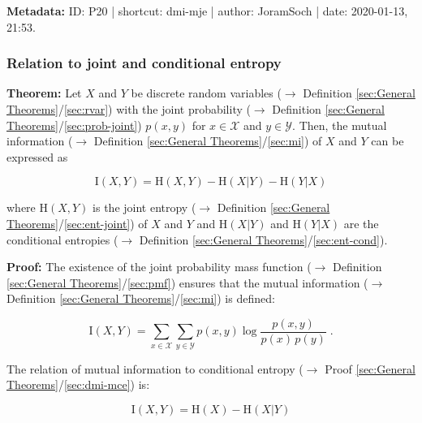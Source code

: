 \documentclass[a4paper,12pt,twoside]{book}
\begin{document}
\vspace{1em}
\textbf{Metadata:} ID: P20 | shortcut: dmi-mje | author: JoramSoch | date: 2020-01-13, 21:53.
\vspace{1em}



\subsubsection[\textbf{Relation to joint and conditional entropy}]{Relation to joint and conditional entropy} \label{sec:dmi-jce}
\setcounter{equation}{0}

\textbf{Theorem:} Let $X$ and $Y$ be discrete random variables ($\rightarrow$ Definition \ref{sec:General Theorems}/\ref{sec:rvar}) with the joint probability ($\rightarrow$ Definition \ref{sec:General Theorems}/\ref{sec:prob-joint}) $p(x,y)$ for $x \in \mathcal{X}$ and $y \in \mathcal{Y}$. Then, the mutual information ($\rightarrow$ Definition \ref{sec:General Theorems}/\ref{sec:mi}) of $X$ and $Y$ can be expressed as

\begin{equation} \label{eq:dmi-jce-dmi-jce}
\mathrm{I}(X,Y) = \mathrm{H}(X,Y) - \mathrm{H}(X|Y) - \mathrm{H}(Y|X)
\end{equation}

where $\mathrm{H}(X,Y)$ is the joint entropy ($\rightarrow$ Definition \ref{sec:General Theorems}/\ref{sec:ent-joint}) of $X$ and $Y$ and $\mathrm{H}(X \vert Y)$ and $\mathrm{H}(Y \vert X)$ are the conditional entropies ($\rightarrow$ Definition \ref{sec:General Theorems}/\ref{sec:ent-cond}).


\vspace{1em}
\textbf{Proof:} The existence of the joint probability mass function ($\rightarrow$ Definition \ref{sec:General Theorems}/\ref{sec:pmf}) ensures that the mutual information ($\rightarrow$ Definition \ref{sec:General Theorems}/\ref{sec:mi}) is defined:

\begin{equation} \label{eq:dmi-jce-MI}
\mathrm{I}(X,Y) = \sum_{x \in \mathcal{X}} \sum_{y \in \mathcal{Y}} p(x,y) \log \frac{p(x,y)}{p(x)\,p(y)} \; .
\end{equation}

The relation of mutual information to conditional entropy ($\rightarrow$ Proof \ref{sec:General Theorems}/\ref{sec:dmi-mce}) is:

\begin{equation} \label{eq:dmi-jce-dmi-mce1}
\mathrm{I}(X,Y) = \mathrm{H}(X) - \mathrm{H}(X|Y)
\end{equation}
\end{document}
